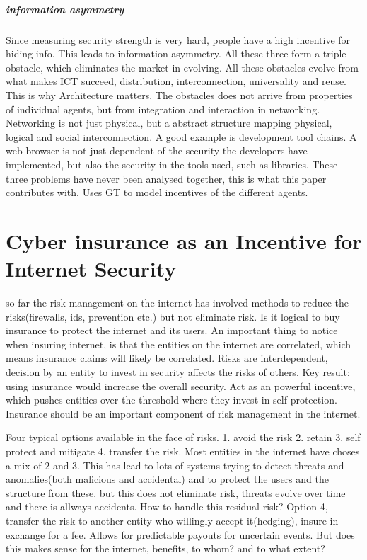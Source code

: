 \subparagraph{information asymmetry}
Since measuring security strength is very hard, people have a high incentive for hiding info. This leads to information asymmetry. 
All these three form a triple obstacle, which eliminates the market in evolving. All these obstacles evolve from what makes ICT succeed, distribution, interconnection, universality and reuse.
This is why Architecture matters. The obstacles does not arrive from properties of individual agents, but from integration and interaction in networking. Networking is not just physical, but a abstract structure mapping physical, logical and social interconnection. A good example is development tool chains. A web-browser is not just dependent of the security the developers have implemented, but also the security in the tools used, such as libraries.
These three problems have never been analysed together, this is what this paper contributes with. Uses GT to model incentives of the different agents. 
\section{Cyber insurance as an Incentive for Internet Security}\label{sec:first_section}
so far the risk management on the internet has involved methods to reduce the
risks(firewalls, ids, prevention etc.) but not eliminate risk. Is it logical to buy
insurance to protect the internet and its users.
An important thing to notice when insuring internet, 
is that the entities on the internet are correlated, which means insurance claims will likely be correlated. Risks are interdependent, decision by an entity to invest in security affects the risks of others.
Key result: using insurance would increase the overall security. Act as an powerful incentive, which pushes entities over the threshold where they invest in self-protection. Insurance should be an important component of risk management in the internet.

Four typical options available in the face of risks. 
1. avoid the risk 2. retain 3. self protect and mitigate 4. transfer the risk.
Most entities in the internet have choses a mix of 2 and 3. This has lead to 
lots of systems trying to detect threats and anomalies(both malicious and accidental) and to protect the users and the structure from these.
but this does not eliminate risk, threats evolve over time and there is allways accidents.
How to handle this residual risk?
Option 4, transfer the risk to another entity who willingly accept it(hedging), insure in exchange for a fee. Allows for predictable payouts for uncertain events.
But does this makes sense for the internet, benefits, to whom? and to what extent?

